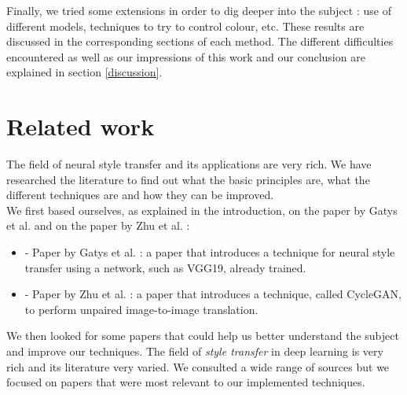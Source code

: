 \documentclass[twocolumn,superscriptaddress,aps, floatfix]{revtex4-1}
\begin{document}
    Finally, we tried some extensions in order to dig deeper into the subject : use of different models, techniques to try to control colour, etc. These results are discussed in the corresponding sections of each method. The different difficulties encountered as well as our impressions of this work and our conclusion are explained in section \ref{discussion}.
    
    
    
    
    \section{Related work}
    
    The field of neural style transfer and its applications are very rich. We have researched the literature to find out what the basic principles are, what the different techniques are and how they can be improved.\\
    
    We first based ourselves, as explained in the introduction, on the paper by Gatys et al. and on the paper by Zhu et al. :
    
    \begin{itemize}
        \item \cite{DBLP:journals/corr/GatysEB15a} - Paper by Gatys et al. : a paper that introduces a technique for neural style transfer using a network, such as VGG19, already trained.
        \item \cite{DBLP:journals/corr/ZhuPIE17} - Paper by Zhu et al. : a paper that introduces a technique, called CycleGAN, to perform unpaired image-to-image translation.
    \end{itemize}
    
    We then looked for some papers that could help us better understand the subject and improve our techniques. The field of \emph{style transfer} in deep learning is very rich and its literature very varied. We consulted a wide range of sources but we focused on papers that were most relevant to our implemented techniques.
    
\end{document}
